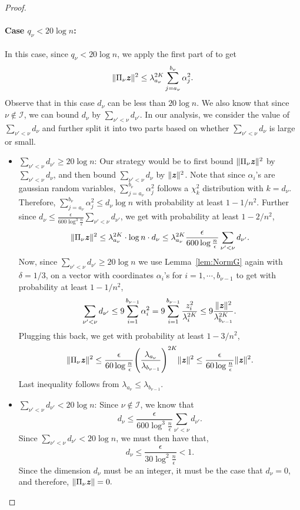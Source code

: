 \begin{proof}
\paragraph{Case $q_{\nu} <20 \log n$:} In this case, since $q_{\nu}<20\log n$, we apply the first part of  to get
\[
\|\Pi_{\nu}\boldsymbol{\mathit{z}}\|^2\leq  \lambda_{a_{\nu}}^{2K} \sum_{j=a_{\nu}}^{b_{\nu}}\alpha_j^2.
\]
Observe that in this case $d_{\nu}$ can be less than $20\log n$. We also know that since $\nu \notin \mathcal{I}$, we can bound $d_{\nu}$ by $\sum_{\nu'<\nu}d_{\nu'}$. In our analysis, we consider the value of $\sum_{\nu'<\nu}d_{\nu}$ and further split it into two parts based on whether $\sum_{\nu'<\nu}d_{\nu}$ is large or small.
\begin{itemize}
    \item $\sum_{\nu'<\nu} d_{\nu'} \geq 20 \log n$: Our strategy would be to first bound $\|\Pi_{\nu}\boldsymbol{\mathit{z}}\|^2$ by $\sum_{\nu'<\nu}d_{\nu}$, and then bound $\sum_{\nu'<\nu}d_{\nu}$ by $\|\boldsymbol{\mathit{z}}\|^2$. Note that since $\alpha_i$'s are gaussian random variables, $\sum_{j=a_{\nu}}^{b_{\nu}}\alpha_j^2$ follows a $\chi^2_k$ distribution with $k = d_{\nu}$. Therefore, $\sum_{j=a_{\nu}}^{b_{\nu}}\alpha_j^2 \leq d_{\nu} \log n$ with probability at least $1-1/n^2$. Further since $d_{\nu}\leq \frac{\epsilon}{600 \log^3 \frac{n}{\epsilon}}\sum_{\nu'<\nu} d_{\nu'}$, we get with probability at least $1-2/n^2$,
    \[
    \|\Pi_{\nu}\boldsymbol{\mathit{z}}\|^2\leq  \lambda_{a_{\nu}}^{2K} \cdot \log n\cdot d_{\nu} \leq \lambda_{a_{\nu}}^{2K}\frac{\epsilon}{600\log \frac{n}{\epsilon}}\sum_{\nu'<\nu} d_{\nu'}.
    \]
    Now, since $\sum_{\nu'<\nu} d_{\nu'} \geq 20 \log n$ we use Lemma~\ref{lem:NormG} again with $\delta = 1/3$, on a vector with coordinates $\alpha_i$'s for $i = 1,\cdots,b_{\nu-1}$ to get with probability at least $1-1/n^2$, 
    \[
    \sum_{\nu'<\nu} d_{\nu'} \leq 9\sum_{i=1}^{b_{\nu-1}}\alpha_i^2=9\sum_{i=1}^{b_{\nu-1}}\frac{z_i^2}{\lambda_i^{2K}} \leq 9\frac{\|\boldsymbol{\mathit{z}}\|^2}{\lambda_{b_{\nu-1}}^{2K}}.
    \]
    Plugging this back, we get with probability at least $1-3/n^2$,
    \[
    \|\Pi_{\nu}\zz\|^2\leq \frac{\epsilon}{60\log \frac{n}{\epsilon}} \left(\frac{\lambda_{a_{\nu}}}{\lambda_{b_{\nu-1}}}\right)^{2K}\|\zz\|^2 \leq\frac{\epsilon}{60\log \frac{n}{\epsilon}}\|\zz\|^2.
\]
Last inequality follows from $\lambda_{a_{\nu}} \leq \lambda_{b_{\nu-1}}$.
\item $\sum_{\nu'<\nu} d_{\nu'} < 20 \log n$: Since $\nu\notin \mathcal{I}$, we know that 
\[
d_{\nu}\leq \frac{\epsilon}{600 \log^3\frac{n}{\epsilon}}\sum_{\nu'<\nu}d_{\nu'}.
\]
Since $\sum_{\nu'<\nu} d_{\nu'} < 20 \log n$, we must then have that,
\[
d_{\nu}\leq \frac{\epsilon}{30 \log^2\frac{n}{\epsilon}} <1.
\]
Since the dimension $d_{\nu}$ must be an integer, it must be the case that $d_{\nu} = 0$, and therefore, $\|\Pi_{\nu}\boldsymbol{\mathit{z}}\| = 0.$
\end{itemize}
\end{proof}


